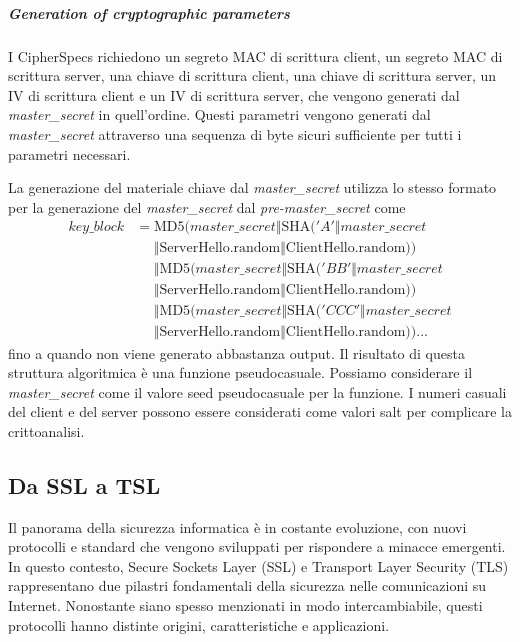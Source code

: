 \documentclass{article}
\theoremstyle{definition}
\begin{document}
\subparagraph{Generation of cryptographic parameters}
I CipherSpecs richiedono un segreto MAC di scrittura client, un segreto MAC di scrittura server, una chiave di scrittura client, una chiave di scrittura server, un IV di scrittura client e un IV di scrittura server, che vengono generati dal \textit{master\_secret} in quell'ordine. Questi parametri vengono generati dal \textit{master\_secret} attraverso una sequenza di byte sicuri sufficiente per tutti i parametri necessari.

La generazione del materiale chiave dal \textit{master\_secret} utilizza lo stesso formato per la generazione del \textit{master\_secret} dal \textit{pre-master\_secret} come
\begin{align*}
\textit{key\_block} &= \text{MD5}(\textit{master\_secret} \Vert \text{SHA}('A' \Vert \textit{master\_secret} \\
&\phantom{=} \Vert \text{ServerHello.random} \Vert \text{ClientHello.random})) \\
&\phantom{=} \Vert \text{MD5}(\textit{master\_secret} \Vert \text{SHA}('BB' \Vert \textit{master\_secret} \\
&\phantom{=} \Vert \text{ServerHello.random} \Vert \text{ClientHello.random})) \\
&\phantom{=} \Vert \text{MD5}(\textit{master\_secret} \Vert \text{SHA}('CCC' \Vert \textit{master\_secret} \\
&\phantom{=} \Vert \text{ServerHello.random} \Vert \text{ClientHello.random})) \dots
\end{align*}
fino a quando non viene generato abbastanza output. Il risultato di questa struttura algoritmica è una funzione pseudocasuale. Possiamo considerare il \textit{master\_secret} come il valore seed pseudocasuale per la funzione. I numeri casuali del client e del server possono essere considerati come valori salt per complicare la crittoanalisi. \cite{tls}

\subsection{Da SSL a TSL}
Il panorama della sicurezza informatica è in costante evoluzione, con nuovi protocolli e standard che vengono sviluppati per rispondere a minacce emergenti. In questo contesto, Secure Sockets Layer (SSL) e Transport Layer Security (TLS) rappresentano due pilastri fondamentali della sicurezza nelle comunicazioni su Internet. Nonostante siano spesso menzionati in modo intercambiabile, questi protocolli hanno distinte origini, caratteristiche e applicazioni.
\end{document}

